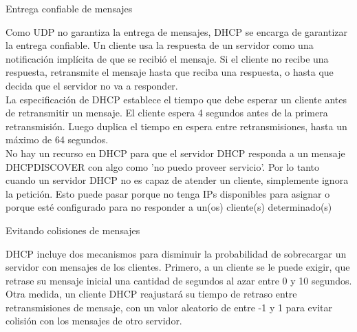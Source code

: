 \begin{frame}[fragile]{Entrega confiable de mensajes}

   Como UDP no garantiza la entrega de mensajes, DHCP se encarga de garantizar
   la entrega confiable. Un cliente usa la respuesta de un servidor como una
   notificación implícita de que se recibió el mensaje. Si el cliente
   no recibe una respuesta, retransmite el mensaje hasta que
   reciba una respuesta, o hasta que decida que el servidor no va a
   responder.\\[0.2cm]

   La especificación de DHCP establece el tiempo que debe esperar un cliente
   antes de retransmitir un mensaje. El cliente espera 4 segundos antes de la
   primera retransmisión. Luego duplica el tiempo en espera entre
   retransmisiones, hasta un máximo de 64 segundos.\\[0.2cm]

   No hay un recurso en DHCP para que el servidor DHCP responda a un mensaje
   DHCPDISCOVER con algo como 'no puedo proveer servicio'. Por lo tanto cuando
   un servidor DHCP no es capaz de atender un cliente, simplemente ignora la
   petición. Esto puede pasar porque no tenga IPs disponibles para asignar o
   porque esté configurado para no responder a un(os) cliente(s)
   determinado(s)\\[0.2cm]

\end{frame}

\begin{frame}[fragile]{Evitando colisiones de mensajes}

    DHCP incluye dos mecanismos para disminuir la probabilidad de sobrecargar
    un servidor con mensajes de los clientes. Primero, a un cliente se le puede
    exigir, que retrase su mensaje inicial una cantidad de segundos al azar
    entre 0 y 10 segundos. Otra medida, un cliente DHCP reajustará su tiempo de
    retraso entre retransmisiones de mensaje, con un valor aleatorio de entre
    -1 y 1 para evitar colisión con los mensajes de otro servidor.\\[0.2cm]

\end{frame}

